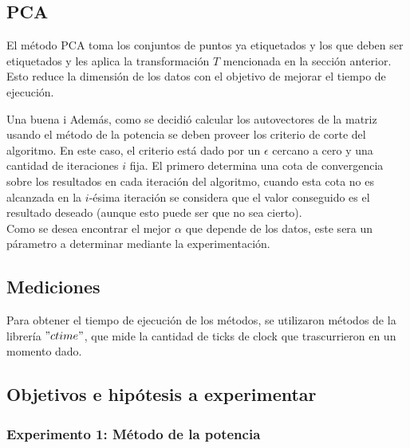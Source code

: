 \subsection*{PCA}



El método PCA toma los conjuntos de puntos ya etiquetados y los que deben ser etiquetados y les aplica la transformación $T$ mencionada en la sección anterior. Esto reduce la dimensión de los datos con el objetivo de mejorar el tiempo de ejecución.

Una buena i
Además, como se decidió calcular los autovectores de la matriz usando el método de la potencia se deben proveer los criterio de corte del algoritmo. En este caso, el criterio está dado por un $\epsilon$ cercano a cero y una cantidad de iteraciones $i$ fija. El primero determina una cota de convergencia sobre los resultados en cada iteración del algoritmo, cuando esta cota no es alcanzada en la $i$-ésima iteración se considera que el valor conseguido es el resultado deseado (aunque esto puede ser que no sea cierto).\\

Como se desea encontrar el mejor $\alpha$ que depende de los datos, este sera un párametro a determinar mediante la experimentación.

\subsection{Mediciones}

Para obtener el tiempo de ejecución de los métodos, se utilizaron métodos de la librería $"ctime"$, que mide la cantidad de ticks de clock que trascurrieron en un momento dado.

\subsection{Objetivos e hipótesis a experimentar}

\subsubsection{Experimento 1: Método de la potencia}

